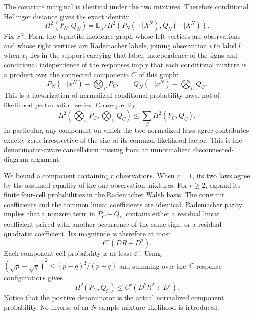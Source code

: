 The covariate marginal is identical under the two mixtures. Therefore conditional Hellinger distance gives the exact identity
\[
H^2(\overline P_N,\overline Q_N)
 =\mathbb E_{X^N}H^2\!\left(\overline P_N(\,\cdot\mid X^N),
 \overline Q_N(\,\cdot\mid X^N)\right).
\]
Fix \(x^N\). Form the bipartite incidence graph whose left vertices are observations and whose right vertices are Rademacher labels, joining observation \(i\) to label \(l\) when \(x_i\) lies in the support carrying that label. Independence of the signs and conditional independence of the responses imply that each conditional mixture is a product over the connected components \(C\) of this graph:
\[
\overline P_N(\,\cdot\mid x^N)=\bigotimes_C P_C,
\qquad
\overline Q_N(\,\cdot\mid x^N)=\bigotimes_C Q_C.
\]
This is a factorization of normalized conditional probability laws, not of likelihood perturbation series. Consequently,
\[
H^2\!\left(\bigotimes_CP_C,\bigotimes_CQ_C\right)
\le\sum_CH^2(P_C,Q_C).
\]
In particular, any component on which the two normalized laws agree contributes exactly zero, irrespective of the size of its common likelihood factor. This is the denominator-aware cancellation missing from an unnormalized disconnected-diagram argument.

We bound a component containing \(r\) observations. When \(r=1\), its two laws agree by the assumed equality of the one-observation mixtures. For \(r\ge2\), expand its finite four-cell probabilities in the Rademacher Walsh basis. The constant coefficients and the common linear coefficients are identical. Rademacher parity implies that a nonzero term in \(P_C-Q_C\) contains either a residual linear coefficient paired with another occurrence of the same sign, or a residual quadratic coefficient. Its magnitude is therefore at most
\[
C^r(DR+D^2).
\]
Each component cell probability is at least \(\varepsilon^r\). Using \((\sqrt p-\sqrt q)^2\le(p-q)^2/(p+q)\) and summing over the \(4^r\) response configurations gives
\[
H^2(P_C,Q_C)\le C^r(D^2R^2+D^4).
\]
Notice that the positive denominator is the actual normalized component probability. No inverse of an \(N\)-sample mixture likelihood is introduced.

